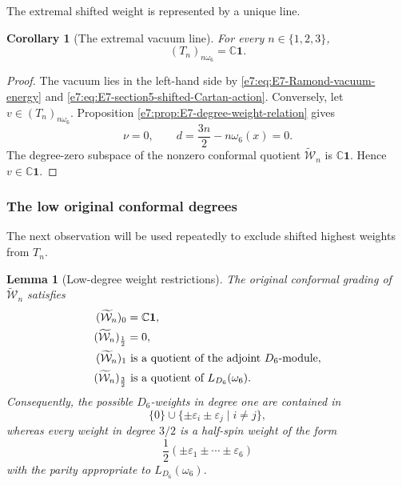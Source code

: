 \documentclass[11pt,reqno]{amsart}
\newtheorem{lemma}[theorem]{Lemma}
\newtheorem{corollary}[theorem]{Corollary}
\theoremstyle{definition}
\theoremstyle{remark}
\begin{document}
The extremal shifted weight is represented by a unique line.

\begin{corollary}[The extremal vacuum line]
\label{e7:cor:E7-extremal-vacuum-line}
For every \(n\in\{1,2,3\}\),
\begin{equation*}
  (T_n)_{n\omega_6}
  =\mathbb C\mathbf1.
\end{equation*}
\end{corollary}

\begin{proof}
The vacuum lies in the left-hand side by
\eqref{e7:eq:E7-Ramond-vacuum-energy} and
\eqref{e7:eq:E7-section5-shifted-Cartan-action}.  Conversely, let
\(v\in(T_n)_{n\omega_6}\).  Proposition
\ref{e7:prop:E7-degree-weight-relation} gives
\[
  \nu=0,
  \qquad
  d=\frac{3n}{2}-n\omega_6(x)=0.
\]
The degree-zero subspace of the nonzero conformal quotient
\(\widetilde{\mathcal W}_n\) is \(\mathbb C\mathbf1\).  Hence
\(v\in\mathbb C\mathbf1\).
\end{proof}

\subsubsection{The low original conformal degrees}


The next observation will be used repeatedly to exclude shifted highest
weights from \(T_n\).

\begin{lemma}[Low-degree weight restrictions]
\label{e7:lem:E7-low-degree-weight-restrictions}
The original conformal grading of \(\widetilde{\mathcal W}_n\) satisfies
\begin{align}
  (\widetilde{\mathcal W}_n)_0
  &=\mathbb C\mathbf1,
  \label{e7:eq:E7-Wtilde-degree-zero}\\
  (\widetilde{\mathcal W}_n)_{\frac12}
  &=0,
  \notag\\
  (\widetilde{\mathcal W}_n)_1
  &\text{ is a quotient of the adjoint }D_6\text{-module},
  \notag\\
  (\widetilde{\mathcal W}_n)_{\frac32}
  &\text{ is a quotient of }L_{D_6}(\omega_6).
  \label{e7:eq:E7-Wtilde-degree-three-halves}
\end{align}
Consequently, the possible \(D_6\)-weights in degree one are contained in
\begin{equation*}
  \{0\}\cup\{\pm\varepsilon_i\pm\varepsilon_j\mid i\ne j\},
\end{equation*}
whereas every weight in degree \(3/2\) is a half-spin weight of the form
\begin{equation*}
  \frac12(\pm\varepsilon_1\pm\cdots\pm\varepsilon_6)
\end{equation*}
with the parity appropriate to \(L_{D_6}(\omega_6)\).
\end{lemma}
\end{document}
